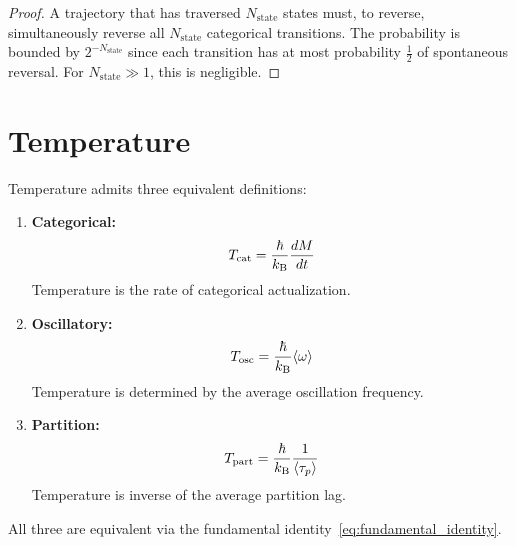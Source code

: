 \begin{proof}
A trajectory that has traversed $N_{\mathrm{state}}$ states must, to reverse, simultaneously reverse all $N_{\mathrm{state}}$ categorical transitions. The probability is bounded by $2^{-N_{\mathrm{state}}}$ since each transition has at most probability $\tfrac{1}{2}$ of spontaneous reversal. For $N_{\mathrm{state}} \gg 1$, this is negligible.
\end{proof}

\section{Temperature}
\label{sec:temperature}

\begin{theorem}
\label{thm:temperature}
Temperature admits three equivalent definitions:
\begin{enumerate}
    \item \textbf{Categorical:}
    \begin{equation}
        T_{\mathrm{cat}} = \frac{\hbar}{k_{\mathrm{B}}}\frac{dM}{dt}
    \end{equation}
    Temperature is the rate of categorical actualization.

    \item \textbf{Oscillatory:}
    \begin{equation}
        T_{\mathrm{osc}} = \frac{\hbar}{k_{\mathrm{B}}}\langle\omega\rangle
    \end{equation}
    Temperature is determined by the average oscillation frequency.

    \item \textbf{Partition:}
    \begin{equation}
        T_{\mathrm{part}} = \frac{\hbar}{k_{\mathrm{B}}}\frac{1}{\langle\tau_p\rangle}
    \end{equation}
    Temperature is inverse of the average partition lag.
\end{enumerate}
All three are equivalent via the fundamental identity~\eqref{eq:fundamental_identity}.
\end{theorem}

